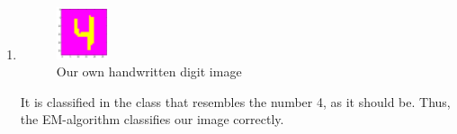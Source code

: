 \documentclass[a4paper,10pt]{article}
\numberwithin{equation}{section} %
\numberwithin{figure}{section} %
\numberwithin{table}{section} %
\theoremstyle{mytheor}
\begin{document}
\begin{enumerate}
	\item \begin{figure}[h]
   			\centering
   			\includegraphics[width=0.144\textwidth]{digits/mydigit.png}\vspace{-0.4cm}
   			\caption{\vspace{-0.1cm} Our own handwritten digit image}\vspace{-0.2cm}
  		\end{figure}
		It is classified in the class that resembles the number 4, as it should be. Thus, the EM-algorithm classifies our image correctly.
		
\vfill
		
\end{enumerate}
\end{document}
